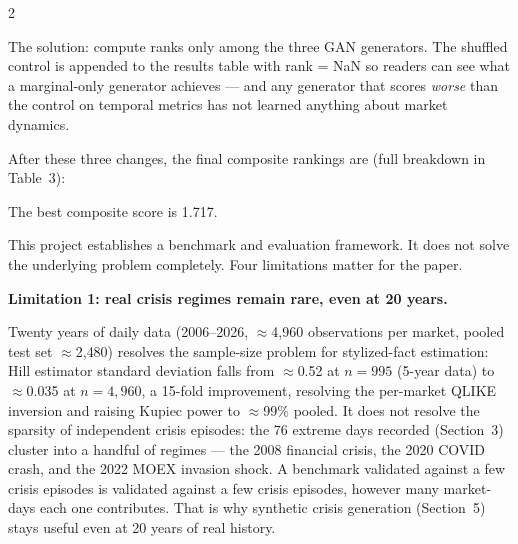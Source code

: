 \documentclass[10pt]{article}
\newcommand{\purplebox}[2]{\begin{tcolorbox}[mybox={Purple}{LBg},title={#1}]#2\end{tcolorbox}}
\begin{document}
\begin{multicols}{2}
{The solution: compute ranks only among the three GAN generators. The shuffled control is appended to the results table with rank = NaN so readers can see what a marginal-only generator achieves --- and any generator that scores \emph{worse} than the control on temporal metrics has not learned anything about market dynamics.

\medskip
After these three changes, the final composite rankings are (full breakdown in
Table~3):


\smallskip
The best composite score is 1.717.}

\columnbreak

\purplebox{9\quad What We Still Cannot Do}{%
This project establishes a benchmark and evaluation framework. It does not solve the underlying problem completely. Four limitations matter for the paper.

\medskip
\textbf{Limitation 1: real crisis regimes remain rare, even at 20 years.}

Twenty years of daily data (2006--2026, $\approx$4{,}960 observations per market, pooled test set $\approx$2{,}480) resolves the sample-size problem for stylized-fact estimation: Hill estimator standard deviation falls from $\approx$0.52 at $n=995$ (5-year data) to $\approx$0.035 at $n=4{,}960$, a 15-fold improvement, resolving the per-market QLIKE inversion and raising Kupiec power to $\approx$99\% pooled. It does not resolve the sparsity of independent crisis episodes: the 76 extreme days recorded (Section~3) cluster into a handful of regimes --- the 2008 financial crisis, the 2020 COVID crash, and the 2022 MOEX invasion shock. A benchmark validated against a few crisis episodes is validated against a few crisis episodes, however many market-days each one contributes. That is why synthetic crisis generation (Section~5) stays useful even at 20 years of real history.

}
\end{multicols}
\end{document}
